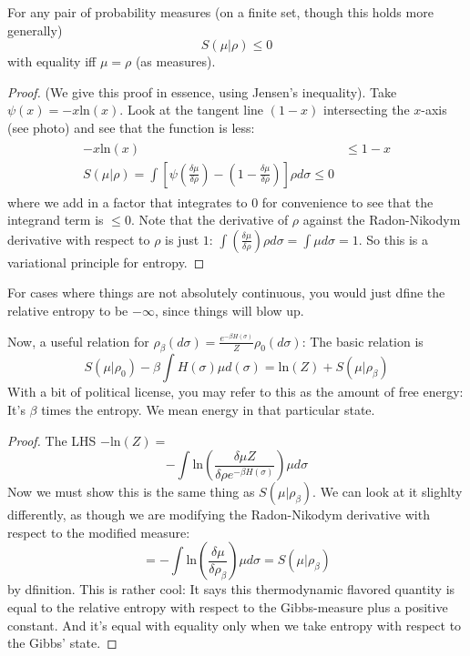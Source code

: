 \begin{lem} For any pair of probability measures (on a finite set, though this holds more generally) 
\[
S(\mu | \rho) \leq 0
\]
with equality iff $\mu = \rho$ (as measures).
\end{lem}
\begin{proof}
(We give this proof in essence, using Jensen's inequality). 
Take $\psi(x) = -x\text{ln}(x)$. Look at the tangent line $(1 - x)$ intersecting the $x$-axis (see photo) and see that the function is less: 
\begin{align*}
\begin{split}
-x \text{ln}(x) &\leq 1 - x
\\
S(\mu | \rho) = \int \left[ \psi(\frac{\delta\mu}{\delta\rho}) - (1 - \frac{\delta\mu}{\delta\rho})\right]\rho d\sigma \leq 0
\end{split}
\end{align*}
where we add in a factor that integrates to $0$ for convenience to see that the integrand term is $\leq 0$. 
Note that the derivative of $\rho$ against the Radon-Nikodym derivative with respect to $\rho$ is just $1$: $\int \left(\frac{\delta \mu}{\delta \rho} \right) \rho d\sigma = \int \mu d\sigma = 1$. 
So this is a variational principle for entropy. 
\end{proof}

\begin{rem}
For cases where things are not absolutely continuous, you would just dfine the relative entropy to be $-\infty$, since things will blow up. 
\end{rem}

Now, a useful relation for $\rho_{\beta}(d\sigma)  = \frac{e^{-\beta H(\sigma)}}{Z} \rho_0 (d\sigma)$: The basic relation is 
\[
S(\mu | \rho_0) - \beta \int H(\sigma) \mu d(\sigma) = \text{ln}(Z) + S(\mu | \rho_{\beta})
\]
With a bit of political license, you may refer to this as the amount of free energy: It's $\beta$ times the entropy. We mean energy in that particular state. 
\begin{proof}
The LHS $- \text{ln}(Z) =$
\[
-\int \text{ln}\left(\frac{\delta\mu Z}{\delta\rho e^{-\beta H(\sigma)}}\right) \mu d\sigma 
\]
Now we must show this is the same thing as $S(\mu | \rho_{\beta})$. We can look at it slighlty differently, as though we are modifying the Radon-Nikodym derivative with respect to the modified measure: 
\[
= -\int \text{ln}\left(\frac{\delta\mu}{\delta\rho_{\beta}}\right) \mu d\sigma = S(\mu|\rho_{\beta})
\]
by dfinition. This is rather cool: It says this thermodynamic flavored quantity is equal to the relative entropy with respect to the Gibbs-measure plus a positive constant. And it's equal with equality only when we take entropy with respect to the Gibbs' state. 
\end{proof}

